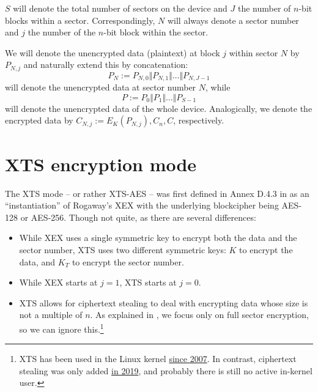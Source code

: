 \documentclass[a4paper]{article}
\begin{document}
$S$ will denote the total number of sectors on the device and $J$ the number of $n$-bit blocks within a sector. Correspondingly, $N$ will always denote a sector number and $j$ the number of the $n$-bit block within the sector.

We will denote the unencrypted data (plaintext) at block $j$ within sector $N$ by $P_{N,j}$ and naturally extend this by concatenation:
$$P_N := P_{N,0} \Vert P_{N,1} \Vert \dots \Vert P_{N,J-1}$$
will denote the unencrypted data at sector number $N$, while
$$P := P_0 \Vert P_1 \Vert \dots \Vert P_{S-1}$$
will denote the unencrypted data of the whole device. Analogically, we denote the encrypted data by $C_{N,j}:=E_K(P_{N,j}), C_n, C$, respectively.

\section{XTS encryption mode} \label{sec:xts}
The XTS mode -- or rather XTS-AES -- was first defined in Annex D.4.3 in \cite{IEEE1619-2018} as an ``instantiation'' of Rogaway's XEX \cite{rogaway2004efficient} with the underlying blockcipher being AES-128 or AES-256. Though not quite, as there are several differences:
\begin{itemize}
    \item While XEX uses a single symmetric key to encrypt both the data and the sector number, XTS uses two different symmetric keys: $K$ to encrypt the data, and $K_T$ to encrypt the sector number.
    \item While XEX starts at $j=1$, XTS starts at $j=0$.
    \item XTS allows for ciphertext stealing to deal with encrypting data whose size is not a multiple of $n$. As explained in , we focus only on full sector encryption, so we can ignore this.\footnote{XTS has been used in the Linux kernel \href{https://git.kernel.org/pub/scm/linux/kernel/git/torvalds/linux.git/commit/crypto/xts.c?id=f19f5111c94053ba4931892f5c01c806de33942e}{since 2007}.
    In contrast, ciphertext stealing was only added \href{https://git.kernel.org/pub/scm/linux/kernel/git/torvalds/linux.git/commit/crypto/xts.c?id=8083b1bf8163e7ae7d8c90f221106d96450b8aa8}{in 2019},
    and probably there is still no active in-kernel user.
    }
\end{itemize}
\end{document}
